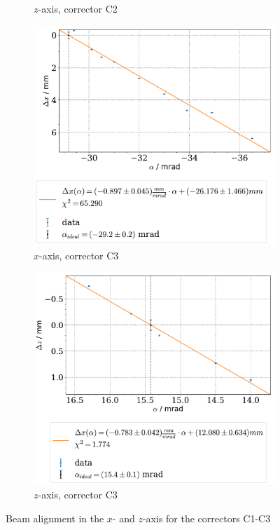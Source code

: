 \documentclass[11pt,a4paper,notitlepage]{scrartcl}
\begin{document}
\begin{figure}
\begin{subfigure}{.49\linewidth}
		\caption{$z$-axis, corrector C2}
	\end{subfigure}
	\begin{subfigure}{.49\linewidth}
		\includegraphics[width=\linewidth]{figs/calibration/q4_x.pdf}
		\caption{$x$-axis, corrector C3}
	\end{subfigure}
	\begin{subfigure}{.49\linewidth}
		\includegraphics[width=\linewidth]{figs/calibration/q4_z.pdf}
		\caption{$z$-axis, corrector C3}
	\end{subfigure}
	\caption{Beam alignment in the $x$- and $z$-axis for the correctors C1-C3}\label{fig:quad_calib_rest}
\end{figure}
\newpage
\end{document}

